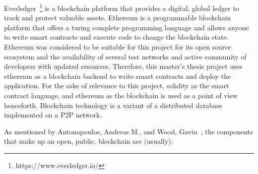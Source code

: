 Everledger~\footnote{https://www.everledger.io/} is a blockchain platform that
provides a digital, global ledger to track and protect valuable assets.
Ethereum is a programmable blockchain platform that offers a turing complete
programming language and allows anyone to write smart contracts and execute
code to change the blockchain state.  Ethereum was considered to be suitable
for this project for its open source ecosystem and the availability of several
test networks and active community of developers with updated resources.
Therefore, this master's thesis project uses ethereum as a blockchain backend
to write smart contracts and deploy the application.  For the sake of relevance
to this project, solidity as the smart contract language, and ethereum as the
blockchain is used as a point of view henceforth. Blockchain technology is a variant of a distributed database implemented on a P2P network. \par
As mentioned by Antonopoulos, Andreas M., and Wood,
Gavin~\cite{MasteringEthereum}, the components that make up an open, public,
blockchain are (usually):

